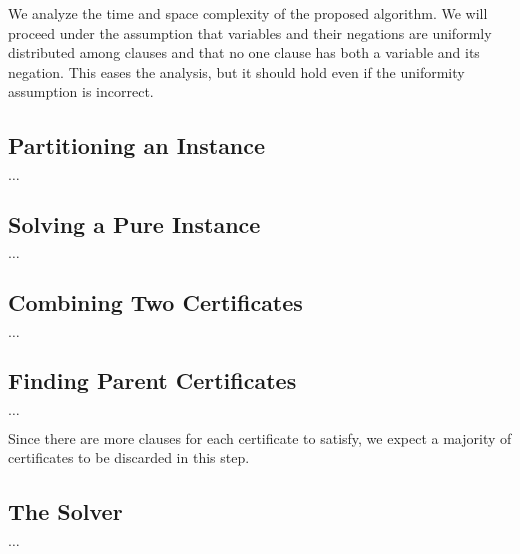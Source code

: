 We analyze the time and space complexity of the proposed algorithm.
We will proceed under the assumption that variables and their negations are uniformly distributed among clauses and that no one clause has both a variable and its negation.
This eases the analysis, but it should hold even if the uniformity assumption is incorrect.


\subsection{Partitioning an Instance}
\label{subsec:partitioning-an-instance-analysis}

$\dots$


\subsection{Solving a Pure Instance}
\label{subsec:solving-a-pure-instance-analysis}

$\dots$


\subsection{Combining Two Certificates}
\label{subsec:combining-two-certificates-analysis}

$\dots$


\subsection{Finding Parent Certificates}
\label{subsec:finding-parent-certificates2}

$\dots$

Since there are more clauses for each certificate to satisfy, we expect a majority of certificates to be discarded in this step.


\subsection{The Solver}
\label{subsec:the-solver-analysis}

$\dots$
